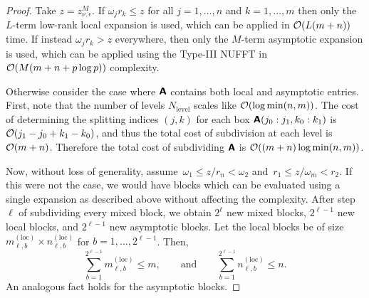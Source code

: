 \begin{proof}
    Take $z = z_{\nu, \epsilon}^M$. If $\omega_j r_k \leq z$ for all
    $j=1,\dots,n$ and $k=1,\dots,m$ then only the $L$-term low-rank local
    expansion is used, which can be applied in $\mathcal{O}(L(m + n))$ time. If instead
    $\omega_j r_k > z$ everywhere, then only the $M$-term asymptotic expansion
    is used, which can be applied using the Type-III NUFFT in $\mathcal{O}(M(m + n +
    p\log p))$ complexity.

    Otherwise consider the case where $\bm{\mathsf{A}}$ contains both local and
    asymptotic entries. First, note that the number of levels $N_{\text{level}}$
    scales like $\mathcal{O}(\log\min(n,m))$. The cost of determining the splitting
    indices $(j,k)$ for each box $\bm{\mathsf{A}}(j_0:j_1,k_0:k_1)$ is~${\mathcal{O}(j_1-j_0+k_1-k_0)}$, and thus the total cost of subdivision at each level
    is $\mathcal{O}(m+n)$. Therefore the total cost of subdividing $\bm{\mathsf{A}}$ is
    $\mathcal{O}((m+n)\log\min(n,m))$.
    
    Now, without loss of generality, assume~$\omega_1 \leq z/r_n
     < \omega_2$ and~$r_1 \leq z/\omega_m < r_2$. If this were not the case, we
     would have blocks which can be evaluated using a single expansion as
     described above without affecting the complexity.
     After step~$\ell$ of subdividing every mixed block, we obtain $2^{\ell}$ new
    mixed blocks, $2^{\ell-1}$ new local blocks, and $2^{\ell-1}$ new asymptotic
    blocks. Let the local blocks be of size $m_{\ell,b}^{(\text{loc})} \times
    n_{\ell,b}^{(\text{loc})}$ for $b = 1,\dots,2^{\ell-1}$. Then,
    \begin{equation}
      \sum_{b=1}^{2^{\ell-1}} m_{\ell,b}^{(\text{loc})} \leq m, \qquad
      \text{and} \qquad
      \sum_{b=1}^{2^{\ell-1}} n_{\ell,b}^{(\text{loc})} \leq n.
    \end{equation}
    An analogous fact holds for the asymptotic blocks.
    

\end{proof}
